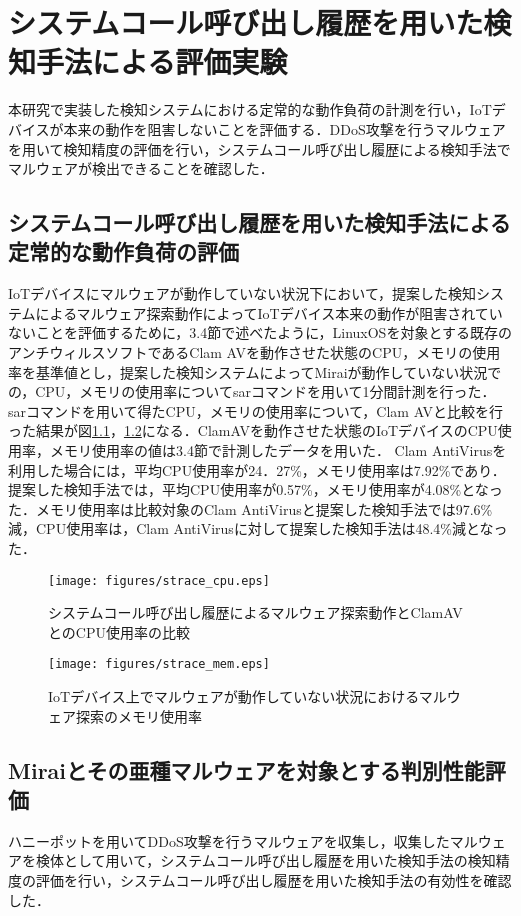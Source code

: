 \chapter{システムコール呼び出し履歴を用いた検知手法による評価実験}
本研究で実装した検知システムにおける定常的な動作負荷の計測を行い，IoTデバイスが本来の動作を阻害しないことを評価する．DDoS攻撃を行うマルウェアを用いて検知精度の評価を行い，システムコール呼び出し履歴による検知手法でマルウェアが検出できることを確認した．

\section{システムコール呼び出し履歴を用いた検知手法による定常的な動作負荷の評価}

IoTデバイスにマルウェアが動作していない状況下において，提案した検知システムによるマルウェア探索動作によってIoTデバイス本来の動作が阻害されていないことを評価するために，3.4節で述べたように，LinuxOSを対象とする既存のアンチウィルスソフトであるClam AVを動作させた状態のCPU，メモリの使用率を基準値とし，提案した検知システムによってMiraiが動作していない状況での，CPU，メモリの使用率についてsarコマンドを用いて1分間計測を行った．
sarコマンドを用いて得たCPU，メモリの使用率について，Clam AVと比較を行った結果が図\ref{fig:strace_cpu}，\ref{fig:strace_mem}になる．ClamAVを動作させた状態のIoTデバイスのCPU使用率，メモリ使用率の値は3.4節で計測したデータを用いた．
Clam AntiVirusを利用した場合には，平均CPU使用率が24．27\%，メモリ使用率は7.92\%であり．提案した検知手法では，平均CPU使用率が0.57\%，メモリ使用率が4.08\%となった．メモリ使用率は比較対象のClam AntiVirusと提案した検知手法では97.6\%減，CPU使用率は，Clam AntiVirusに対して提案した検知手法は48.4\%減となった．


\clearpage
\begin{figure}[h]
    \centering
       \texttt{[image: figures/strace\_cpu.eps]}
    \caption{システムコール呼び出し履歴によるマルウェア探索動作とClamAVとのCPU使用率の比較}
        \label{fig:strace_cpu}
\end{figure}
  
\begin{figure}[h]
        \centering
           \texttt{[image: figures/strace\_mem.eps]}
        \caption{IoTデバイス上でマルウェアが動作していない状況におけるマルウェア探索のメモリ使用率}
        \label{fig:strace_mem}
\end{figure}
\newpage
\section{Miraiとその亜種マルウェアを対象とする判別性能評価}
ハニーポットを用いてDDoS攻撃を行うマルウェアを収集し，収集したマルウェアを検体として用いて，システムコール呼び出し履歴を用いた検知手法の検知精度の評価を行い，システムコール呼び出し履歴を用いた検知手法の有効性を確認した．

